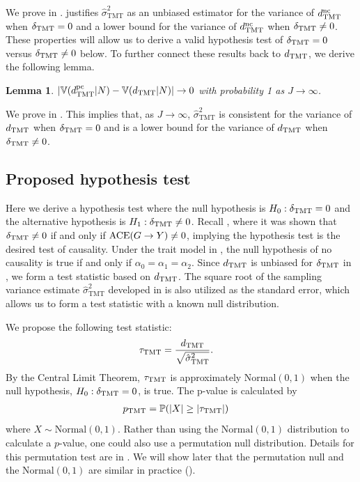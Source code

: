 \documentclass[12pt]{extarticle}
\newtheorem{lem}{Lemma}%
\newcommand{\pp}{\mathbb{P}}
\newcommand{\nind}{J}
\newcommand{\ace}{{\normalfont \text{ACE}}}
\newcommand{\tmt}{{\normalfont \text{TMT}}}
\newcommand{\dtmtnc}{d_{\tmt}^{\normalfont \text{nc}}}
\newcommand{\dtmtpc}{d_{\tmt}^{\normalfont \text{pc}}}
\newcommand{\vtmthat}{\hat{\sigma}^2_{\text{TMT}}}
\newcommand{\V}{\mathbb{V}}
\begin{document}
{\noindent We prove  in .  justifies $\vtmthat$ as an unbiased estimator for the variance of $\dtmtnc$ when $\delta_{\tmt} = 0$ and a lower bound for the variance of $\dtmtnc$ when $\delta_{\tmt} \not= 0$. These properties will allow us to derive a valid hypothesis test of $\delta_{\tmt} = 0$ versus $\delta_{\tmt} \not= 0$ below. To further connect these results back to $d_{\tmt}$, we derive the following lemma.

\begin{lem} \label{lem:vdtmt_converge}
{\normalfont $\left| \V(\dtmtpc|N) - \V(d_{\tmt}|N) \right| \to 0$} with probability 1 as $\nind \to \infty$.
\end{lem}

\noindent We prove  in . This implies that, as $\nind \to \infty$, $\vtmthat$ is consistent for the variance of $d_{\tmt}$ when $\delta_{\tmt} = 0$ and is a lower bound for the variance of $d_{\tmt}$ when $\delta_{\tmt} \not= 0$. 

\subsection{Proposed hypothesis test} \label{sec:h0h1_test}

Here we derive a hypothesis test where the null hypothesis is $H_0: \delta_{\tmt} = 0$ and the alternative hypothesis is $H_1: \delta_{\tmt} \not= 0$. Recall , where it was shown that $\delta_{\tmt} \not= 0$ if and only if $\ace (G\to Y) \neq 0$, implying the hypothesis test is the desired test of causality. Under the trait model in , the null hypothesis of no causality is true if and only if $\alpha_0=\alpha_1=\alpha_2$. Since $d_{\tmt}$ is unbiased for $\delta_{\tmt}$ in , we form a test statistic based on $d_{\tmt}$. The square root of the sampling variance estimate $\vtmthat$ developed in  is also utilized as the standard error, which allows us to form a test statistic with a known null distribution.

We propose the following test statistic:
\begin{align} \label{eq:tau_tmt}
\tau_{\tmt} &= \frac{d_{\tmt}}{\sqrt{\vtmthat}}.
\end{align} By the Central Limit Theorem, $\tau_{\tmt}$ is approximately Normal$(0,1)$ when the null hypothesis, $H_0: \delta_{\tmt} = 0$, is true. The p-value is calculated by
\begin{align*}
p_{\tmt} &= \pp(|X| \geq |\tau_{\tmt}|)
\end{align*} where $X \sim \text{Normal}(0,1)$. Rather than using the $\text{Normal}(0,1)$ distribution to calculate a $p$-value, one could also use a permutation null distribution. Details for this permutation test are in . We will show later that the permutation null and the  $\text{Normal}(0,1)$ are similar in practice (). 

}
\end{document}
